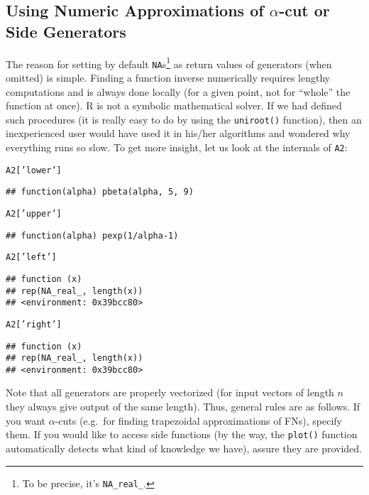 \documentclass[11pt]{article}\usepackage{graphicx, color}
\makeatletter
\newcommand{\hlstring}[1]{\textcolor[rgb]{0.6,0.6,1}{#1}}%
\newenvironment{kframe}{%
 \def\at@end@of@kframe{}%
 \ifinner\ifhmode%
  \def\at@end@of@kframe{\end{minipage}}%
  \begin{minipage}{\columnwidth}%
 \fi\fi%
 \def\FrameCommand##1{\hskip\@totalleftmargin \hskip-\fboxsep
 \colorbox{shadecolor}{##1}\hskip-\fboxsep
     \hskip-\linewidth \hskip-\@totalleftmargin \hskip\columnwidth}%
 \MakeFramed {\advance\hsize-\width
   \@totalleftmargin\z@ \linewidth\hsize
   \@setminipage}}%
 {\par\unskip\endMakeFramed%
 \at@end@of@kframe}
\newenvironment{knitrout}{}{} %
\newcommand{\lang}[1]{\textsf{#1}\xspace}
\newcommand{\R}{\lang{R}}
\makeatother
\begin{document}
\subsection{Using Numeric Approximations of $\alpha$-cut or Side Generators}

The reason for setting  by default
\texttt{NA}s\footnote{To be precise, it's \texttt{NA\_real\_}.}
as return values of generators
(when omitted) is simple. Finding a function inverse numerically
requires lengthy computations and is always done locally
(for a given point, not for ``whole'' the function at once).
\R is not a symbolic mathematical solver.
If we had defined such procedures (it is really easy to do
by using the \texttt{uniroot()} function), then an inexperienced user
would have used it in his/her algorithms and wondered why everything
runs so slow. To get more insight, let us look at the internals of \texttt{A2}:

\begin{knitrout}\small
{}\color{fgcolor}\begin{kframe}
\begin{alltt}
A2[\hlstring{'lower'}]
\end{alltt}
\begin{verbatim}
## function(alpha) pbeta(alpha, 5, 9)
\end{verbatim}
\begin{alltt}
A2[\hlstring{'upper'}]
\end{alltt}
\begin{verbatim}
## function(alpha) pexp(1/alpha-1)
\end{verbatim}
\begin{alltt}
A2[\hlstring{'left'}]
\end{alltt}
\begin{verbatim}
## function (x) 
## rep(NA_real_, length(x))
## <environment: 0x39bcc80>
\end{verbatim}
\begin{alltt}
A2[\hlstring{'right'}]
\end{alltt}
\begin{verbatim}
## function (x) 
## rep(NA_real_, length(x))
## <environment: 0x39bcc80>
\end{verbatim}
\end{kframe}
\end{knitrout}


\noindent
Note that all generators are properly vectorized (for
input vectors of length $n$ they always give output of the
same length).
Thus, general rules are as follows.
If you want $\alpha$-cuts (e.g.~for finding
trapezoidal approximations of FNs), specify them.
If you would like to access side functions (by the way,
the \texttt{plot()} function
automatically detects what kind of knowledge we have),
assure they are provided.
\end{document}
